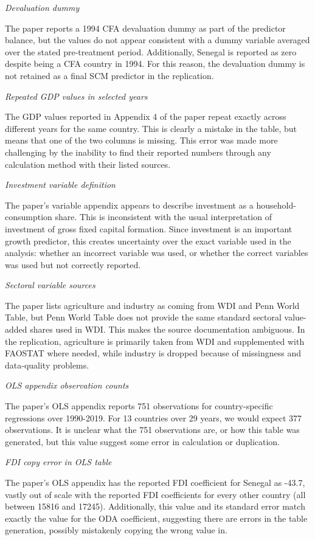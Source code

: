 \documentclass[a4paper]{article}
\begin{document}
\textit{Devaluation dummy}

The paper reports a 1994 CFA devaluation dummy as part of the predictor balance, but the values do not appear consistent with a dummy variable averaged over the stated pre-treatment period. Additionally, Senegal is reported as zero despite being a CFA country in 1994. For this reason, the devaluation dummy is not retained as a final SCM predictor in the replication. 

\textit{Repeated GDP values in selected years}

The GDP values reported in Appendix 4 of the paper repeat exactly across different years for the same country. This is clearly a mistake in the table, but means that one of the two columns is missing. This error was made more challenging by the inability to find their reported numbers through any calculation method with their listed sources. 

\textit{Investment variable definition}

The paper's variable appendix appears to describe investment as a household-consumption share. This is inconsistent with the usual interpretation of investment of gross fixed capital formation. Since investment is an important growth predictor, this creates uncertainty over the exact variable used in the analysis: whether an incorrect variable was used, or whether the correct variables was used but not correctly reported. 

\textit{Sectoral variable sources}

The paper lists agriculture and industry as coming from WDI and Penn World Table, but Penn World Table does not provide the same standard sectoral value-added shares used in WDI. This makes the source documentation ambiguous. In the replication, agriculture is primarily taken from WDI and supplemented with FAOSTAT where needed, while industry is dropped because of missingness and data-quality problems.

\textit{OLS appendix observation counts}

The paper's OLS appendix reports 751 observations for country-specific regressions over 1990-2019. For 13 countries over 29 years, we would expect 377 observations. It is unclear what the 751 observations are, or how this table was generated, but this value suggest some error in calculation or duplication. 

\textit{FDI copy error in OLS table}

The paper's OLS appendix has the reported FDI coefficient for Senegal as -43.7, vastly out of scale with the reported FDI coefficients for every other country (all between 15816 and 17245). Additionally, this value and its standard error match exactly the value for the ODA coefficient, suggesting there are errors in the table generation, possibly mistakenly copying the wrong value in.
\end{document}
